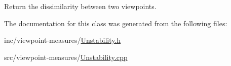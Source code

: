 Return the dissimilarity between two viewpoints. 



The documentation for this class was generated from the following files\+:\begin{DoxyCompactItemize}
\item 
inc/viewpoint-\/measures/\hyperlink{_unstability_8h}{Unstability.\+h}\item 
src/viewpoint-\/measures/\hyperlink{_unstability_8cpp}{Unstability.\+cpp}\end{DoxyCompactItemize}
